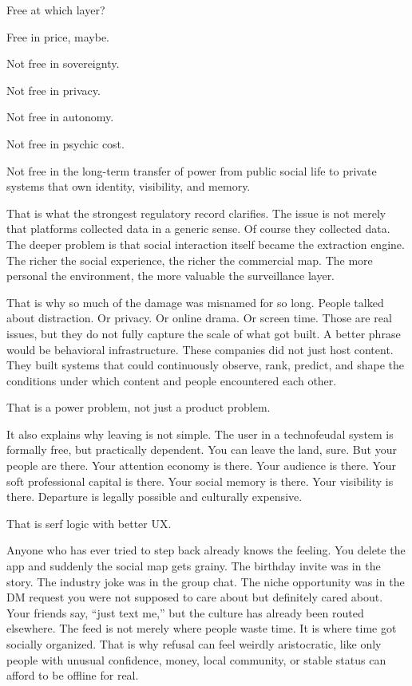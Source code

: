 \documentclass[
  american,
  12pt,
  letterpaper,
]{article}
\begin{document}
Free at which layer?

Free in price, maybe.

Not free in sovereignty.

Not free in privacy.

Not free in autonomy.

Not free in psychic cost.

Not free in the long-term transfer of power from public social life to
private systems that own identity, visibility, and memory.

That is what the strongest regulatory record clarifies. The issue is not
merely that platforms collected data in a generic sense. Of course they
collected data. The deeper problem is that social interaction itself
became the extraction engine. The richer the social experience, the
richer the commercial map. The more personal the environment, the more
valuable the surveillance layer.

That is why so much of the damage was misnamed for so long. People
talked about distraction. Or privacy. Or online drama. Or screen time.
Those are real issues, but they do not fully capture the scale of what
got built. A better phrase would be behavioral infrastructure. These
companies did not just host content. They built systems that could
continuously observe, rank, predict, and shape the conditions under
which content and people encountered each other.

That is a power problem, not just a product problem.

It also explains why leaving is not simple. The user in a technofeudal
system is formally free, but practically dependent. You can leave the
land, sure. But your people are there. Your attention economy is there.
Your audience is there. Your soft professional capital is there. Your
social memory is there. Your visibility is there. Departure is legally
possible and culturally expensive.

That is serf logic with better UX.

Anyone who has ever tried to step back already knows the feeling. You
delete the app and suddenly the social map gets grainy. The birthday
invite was in the story. The industry joke was in the group chat. The
niche opportunity was in the DM request you were not supposed to care
about but definitely cared about. Your friends say, ``just text me,''
but the culture has already been routed elsewhere. The feed is not
merely where people waste time. It is where time got socially organized.
That is why refusal can feel weirdly aristocratic, like only people with
unusual confidence, money, local community, or stable status can afford
to be offline for real.
\end{document}
